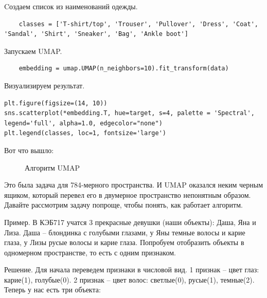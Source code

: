 \begin{itemize}
	Cоздаем список из наименований одежды.
\begin{verbatim}
	classes = ['T-shirt/top', 'Trouser', 'Pullover', 'Dress', 'Coat', 'Sandal', 'Shirt', 'Sneaker', 'Bag', 'Ankle boot']
\end{verbatim}


Запускаем UMAP.

\begin{verbatim}
	embedding = umap.UMAP(n_neighbors=10).fit_transform(data)
\end{verbatim}

	Визуализируем результат.
	\begin{verbatim}
plt.figure(figsize=(14, 10))
sns.scatterplot(*embedding.T, hue=target, s=4, palette = 'Spectral',
legend='full', alpha=1.0, edgecolor="none")
plt.legend(classes, loc=1, fontsize='large')
	\end{verbatim}

Вот что вышло:

\begin{figure}[bh]
	\noindent{}
	\caption{Алгоритм UMAP}
	\label{figCurves}
\end{figure}

Это была задача для 784-мерного пространства. И UMAP оказался неким черным ящиком, который перевел его в двумерное пространство непонятным образом. Давайте рассмотрим задачу попроще, чтобы понять, как работает алгоритм.

Пример. В КЭБ717 учатся 3 прекрасные девушки (наши объекты): Даша, Яна и Лиза. Даша -- блондинка с голубыми глазами, у Яны темные волосы и карие глаза, у Лизы русые волосы и карие глаза. Попробуем отобразить объекты в одномерном пространстве, то есть с одним признаком.

Решение. Для начала переведем признаки в числовой вид. 1 признак -- цвет глаз: карие(1), голубые(0). 2 признак -- цвет волос: светлые(0), русые(1), темные(2). Теперь у нас есть три объекта:


\end{itemize}
